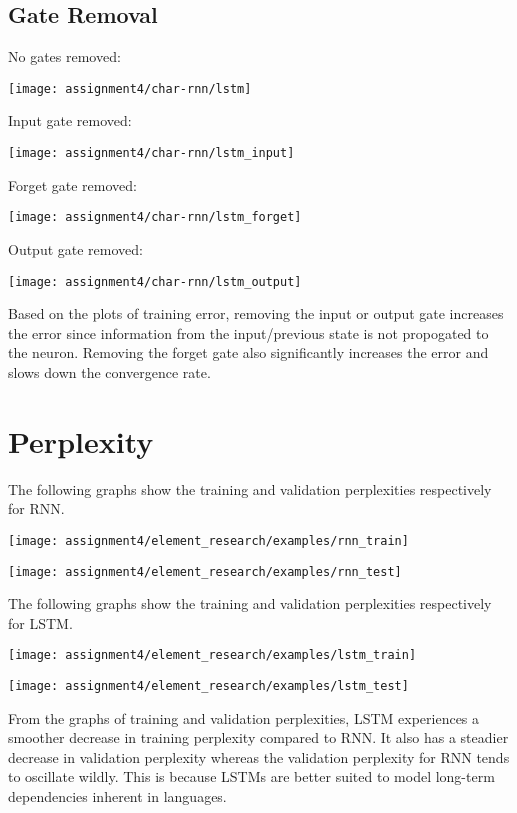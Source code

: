 \documentclass[twoside,12pt]{article}
\newcommand{\imsize}{0.5\linewidth}
\begin{document}
\subsection{Gate Removal}

No gates removed:

\texttt{[image: assignment4/char-rnn/lstm]}

Input gate removed:

\texttt{[image: assignment4/char-rnn/lstm\_input]}

Forget gate removed:

\texttt{[image: assignment4/char-rnn/lstm\_forget]}

Output gate removed:

\texttt{[image: assignment4/char-rnn/lstm\_output]}

Based on the plots of training error, removing the input or output gate
increases the error since information from the input/previous state
is not propogated to the neuron. Removing the forget gate also
significantly increases the error and slows down the convergence rate.

\section{Perplexity}

The following graphs show the training and validation perplexities respectively for RNN.

\texttt{[image: assignment4/element\_research/examples/rnn\_train]}

\texttt{[image: assignment4/element\_research/examples/rnn\_test]}

The following graphs show the training and validation perplexities respectively for LSTM.

\texttt{[image: assignment4/element\_research/examples/lstm\_train]}

\texttt{[image: assignment4/element\_research/examples/lstm\_test]}

From the graphs of training and validation perplexities, LSTM experiences a smoother decrease in
training perplexity compared to RNN. It also has a steadier decrease in validation perplexity whereas
the validation perplexity for RNN tends to oscillate wildly. This is because LSTMs are better suited
to model long-term dependencies inherent in languages.
\end{document}
